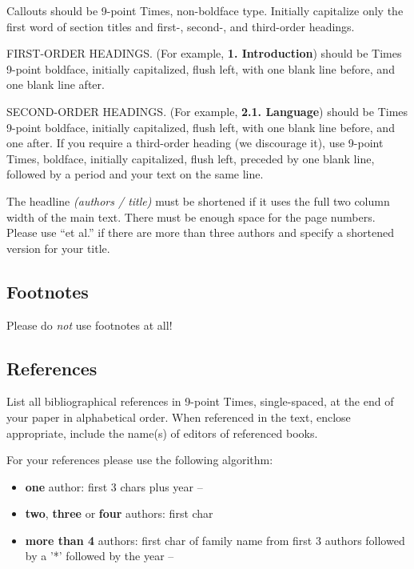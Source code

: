 \noindent Callouts should be 9-point Times, non-boldface type. Initially
capitalize only the first word of section titles and first-, second-, and
third-order headings.

FIRST-ORDER HEADINGS. (For example, \textbf{1. Introduction}) should be Times
9-point boldface, initially capitalized, flush left, with one blank line
before, and one blank line after.

SECOND-ORDER HEADINGS. (For example, \textbf{2.1. Language}) should be Times
9-point boldface, initially capitalized, flush left, with one blank line
before, and one after. If you require a third-order heading (we discourage
it), use 9-point Times, boldface, initially capitalized, flush left, preceded
by one blank line, followed by a period and your text on the same line.

The headline \emph{(authors / title)} must be shortened if it uses the full
two column width of the main text.
There must be enough space for the page numbers. Please use ``et al.'' if
there are more than three authors and specify a shortened version for your title.
\subsection{Footnotes}

Please do \emph{not} use footnotes at all!


\subsection{References}

List all bibliographical references in 9-point Times, single-spaced, at the
end of your paper in alphabetical order. When referenced in the text, enclose
appropriate, include the name(s) of editors of referenced books.

For your references please use the following algorithm:
\begin{itemize}
\item \textbf{one} author: first 3 chars plus year --
\item \textbf{two}, \textbf{three} or \textbf{four} authors: first char
\item \textbf{more than 4} authors: first char of family name from
      first 3 authors followed by a '*' followed by the year --
\end{itemize}


